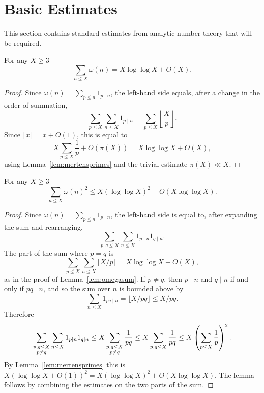 \chapter{Basic Estimates}
\label{chap:basic}

This section contains standard estimates from analytic number theory that will be required.

\begin{lemma}\label{lem:omegasum}
For any $X\geq 3$
\[\sum_{n\leq X}\omega(n) = X\log\log X+O(X).\]
\end{lemma}
\begin{proof}
Since $\omega(n) = \sum_{p\leq n}1_{p\mid n}$, the left-hand side equals, after a change in the order of summation,
\[\sum_{p\leq X}\sum_{n\leq X}1_{p\mid n} = \sum_{p\leq X}\left\lfloor\frac{X}{p}\right\rfloor.\]
Since $\lfloor x\rfloor=x+O(1)$, this is equal to
\[X\sum_{p\leq X}\frac{1}{p} +O(\pi(X)) = X\log\log X+O(X),\]
using Lemma~\ref{lem:mertensprimes} and the trivial estimate $\pi(X)\ll X$.
\end{proof}

\begin{lemma}\label{lem:omegasquaredsum}
For any $X\geq 3$
\[\sum_{n\leq X}\omega(n)^2 \leq X(\log\log X)^2+O(X\log\log X).\]
\end{lemma}
\begin{proof}
Since $\omega(n) = \sum_{p\leq n}1_{p\mid n}$, the left-hand side is equal to, after expanding the sum and rearranging,
\[\sum_{p,q\leq X}\sum_{n\leq X}1_{p\mid n}1_{q\mid n}.\]
The part of the sum where $p=q$ is
\[\sum_{p\leq X}\sum_{n\leq X}\lfloor X/p\rfloor = X\log\log X+O(X),\]
as in the proof of Lemma~\ref{lem:omegasum}. If $p\neq q$, then $p\mid n$ and $q\mid n$ if and only if $pq\mid n$, and so the sum over $n$ is bounded above by
\[\sum_{n\leq X}1_{pq\mid n}= \lfloor X/pq\rfloor \leq X/pq.\]
Therefore
\[\sum_{\substack{p,q\leq X\\ p\neq q}}\sum_{n\leq X}1_{p\mid n}1_{q\mid n}\leq X\sum_{\substack{p,q\leq X\\ p\neq q}}\frac{1}{pq}\leq X\sum_{p,q\leq X}\frac{1}{pq}\leq X\left( \sum_{p\leq X}\frac{1}{p}\right)^2.\]
By Lemma~\ref{lem:mertensprimes} this is $X(\log\log X+O(1))^2 = X(\log\log X)^2+O(X\log\log X)$. The lemma follows by combining the estimates on the two parts of the sum.
\end{proof}

